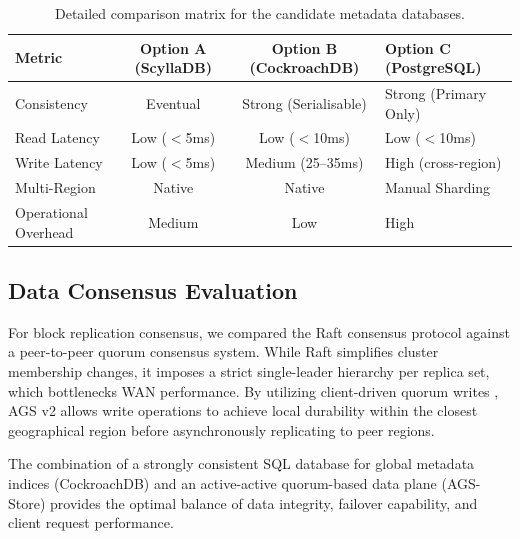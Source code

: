 \begin{table}[h]
    \centering
    \sffamily
    \small
    \begin{tabularx}{\linewidth}{l C C L}
        \toprule
        \textbf{Metric} & \textbf{Option A (ScyllaDB)} & \textbf{Option B (CockroachDB)} & \textbf{Option C (PostgreSQL)} \\
        \midrule
        Consistency & Eventual & Strong (Serialisable) & Strong (Primary Only) \\
        Read Latency & Low ($<$5ms) & Low ($<$10ms) & Low ($<$10ms) \\
        Write Latency & Low ($<$5ms) & Medium (25--35ms) & High (cross-region) \\
        Multi-Region & Native & Native & Manual Sharding \\
        Operational Overhead & Medium & Low & High \\
        \bottomrule
    \end{tabularx}
    \caption{Detailed comparison matrix for the candidate metadata databases.}
    \label{tab:tradeoff_matrix}
\end{table}

\subsection{Data Consensus Evaluation}
For block replication consensus, we compared the Raft consensus protocol against a peer-to-peer quorum consensus system. While Raft simplifies cluster membership changes, it imposes a strict single-leader hierarchy per replica set, which bottlenecks WAN performance. By utilizing client-driven quorum writes \cite{chen2024ags}, AGS v2 allows write operations to achieve local durability within the closest geographical region before asynchronously replicating to peer regions.

\begin{infobox}
    The combination of a strongly consistent SQL database for global metadata indices (CockroachDB) and an active-active quorum-based data plane (AGS-Store) provides the optimal balance of data integrity, failover capability, and client request performance.
\end{infobox}
